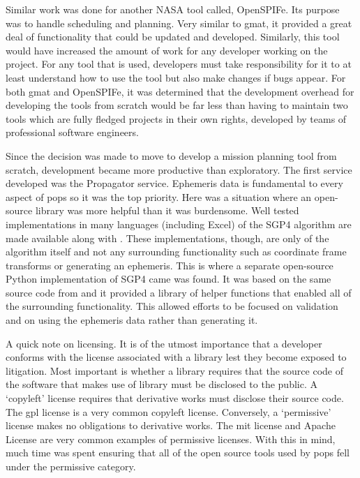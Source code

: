 
Similar work was done for another NASA tool called, OpenSPIFe. Its purpose was
to handle scheduling and planning. Very similar to \gls{gmat}, it provided a
great deal of functionality that could be updated and developed. Similarly,
this tool would have increased the amount of work for any developer working on
the project. For any tool that is used, developers must take responsibility for
it to at least understand how to use the tool but also make changes if bugs
appear. For both \gls{gmat} and OpenSPIFe, it was determined that the
development overhead for developing the tools from scratch would be far less
than having to maintain two tools which are fully fledged projects in their own
rights, developed by teams of professional software engineers.

Since the decision was made to move to develop a mission planning tool from
scratch, development became more productive than exploratory. The first service
developed was the Propagator service. Ephemeris data is fundamental to every
aspect of \gls{pops} so it was the top priority. Here was a situation where an
open-source library was more helpful than it was burdensome. Well tested
implementations in many languages (including Excel) of the SGP4 algorithm are
made available along with \cite{vallado_revisiting_2006}. These
implementations, though, are only of the algorithm itself and not any
surrounding functionality such as coordinate frame transforms or generating an
ephemeris. This is where a separate open-source Python implementation of SGP4
came was found. It was based on the same source code from
\cite{vallado_revisiting_2006} and it provided a library of helper functions
that enabled all of the surrounding functionality.  This allowed efforts to be
focused on validation and on using the ephemeris data rather than generating
it.

A quick note on licensing. It is of the utmost importance that a developer
conforms with the license associated with a library lest they become exposed to
litigation. Most important is whether a library requires that the source code
of the software that makes use of library must be disclosed to the public. A
`copyleft' license requires that derivative works must disclose their source
code. The \gls{gpl} license is a very common copyleft license.  Conversely, a
`permissive' license makes no obligations to derivative works. The \gls{mit}
license and Apache License are very common examples of permissive licenses.
With this in mind, much time was spent ensuring that all of the open source
tools used by \gls{pops} fell under the permissive category.  

